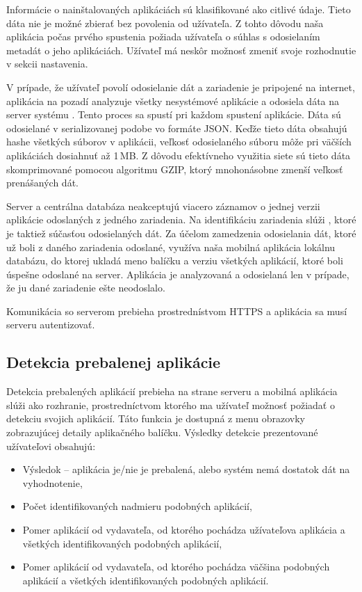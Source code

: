 Informácie o nainštalovaných aplikáciách sú klasifikované ako citlivé údaje. Tieto dáta nie je možné zbierať bez povolenia od užívateľa. Z tohto dôvodu naša aplikácia počas prvého spustenia požiada užívateľa o súhlas s odosielaním metadát o jeho aplikáciách. Užívateľ má neskôr možnosť zmeniť svoje rozhodnutie v sekcii nastavenia.

V prípade, že užívateľ povolí odosielanie dát a zariadenie je pripojené na internet, aplikácia na pozadí analyzuje všetky nesystémové aplikácie a odosiela dáta na server systému . Tento proces sa spustí pri každom spustení aplikácie. Dáta sú odosielané v serializovanej podobe vo formáte JSON. Keďže tieto dáta obsahujú hashe všetkých súborov v aplikácii, veľkosť odosielaného súboru môže pri väčších aplikáciách dosiahnuť až 1\,MB. Z dôvodu efektívneho využitia siete sú tieto dáta skomprimované pomocou algoritmu GZIP, ktorý mnohonásobne zmenší veľkosť prenášaných dát.

Server a centrálna databáza neakceptujú viacero záznamov o jednej verzii aplikácie odoslaných z jedného zariadenia. Na identifikáciu zariadenia slúži , ktoré je taktiež súčasťou odosielaných dát. Za účelom zamedzenia odosielania dát, ktoré už boli z daného zariadenia odoslané, využíva naša mobilná aplikácia lokálnu databázu, do ktorej ukladá meno balíčku a verziu všetkých aplikácií, ktoré boli úspešne odoslané na server. Aplikácia je analyzovaná a odosielaná len v prípade, že ju dané zariadenie ešte neodoslalo.

Komunikácia so serverom prebieha prostrednístvom HTTPS a aplikácia sa musí serveru autentizovať.

\subsection{Detekcia prebalenej aplikácie}
Detekcia prebalených aplikácií prebieha na strane serveru a mobilná aplikácia slúži ako rozhranie, prostredníctvom ktorého ma užívateľ možnosť požiadať o detekciu svojich aplikácií. Táto funkcia je dostupná z menu obrazovky zobrazujúcej detaily aplikačného balíčku. Výsledky detekcie prezentované užívateľovi obsahujú:
\begin{itemize}
	\item Výsledok -- aplikácia je/nie je prebalená, alebo systém nemá dostatok dát na vyhodnotenie,
	\item Počet identifikovaných nadmieru podobných aplikácií,
	\item Pomer aplikácií od vydavateľa, od ktorého pochádza užívateľova aplikácia a všetkých identifikovaných podobných aplikácií,
	\item Pomer aplikácií od vydavateľa, od ktorého pochádza väčšina podobných aplikácií a všetkých identifikovaných podobných aplikácií.
\end{itemize}
	
	
